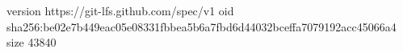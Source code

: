 version https://git-lfs.github.com/spec/v1
oid sha256:be02e7b449eac05e08331fbbea5b6a7fbd6d44032bceffa7079192acc45066a4
size 43840
